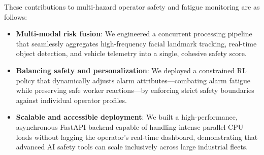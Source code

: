 These contributions to multi-hazard operator safety and fatigue monitoring are as follows:

\begin{itemize}
    \item \textbf{Multi-modal risk fusion}: We engineered a concurrent processing pipeline that seamlessly aggregates high-frequency facial landmark tracking, real-time object detection, and vehicle telemetry into a single, cohesive safety score.
    \item \textbf{Balancing safety and personalization}: We deployed a constrained RL policy that dynamically adjusts alarm attributes—combating alarm fatigue while preserving safe worker reactions—by enforcing strict safety boundaries against individual operator profiles.
    \item \textbf{Scalable and accessible deployment}: We built a high-performance, asynchronous FastAPI backend capable of handling intense parallel CPU loads without lagging the operator's real-time dashboard, demonstrating that advanced AI safety tools can scale inclusively across large industrial fleets.
\end{itemize}